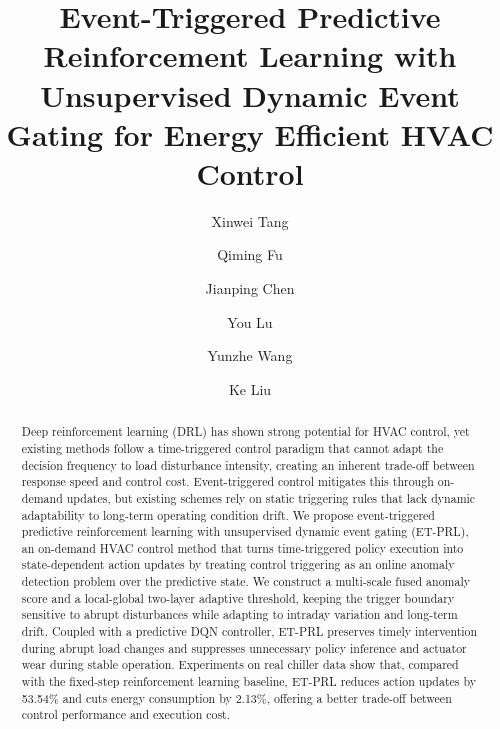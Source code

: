 \documentclass[preprint,12pt,number]{elsarticle}
\begin{document}
\begin{frontmatter}

\title{Event-Triggered Predictive Reinforcement Learning with Unsupervised Dynamic Event Gating for Energy Efficient HVAC Control}

\author[inst1,inst2]{Xinwei Tang}
\author[inst1,inst2]{Qiming Fu}
\author[inst1,inst2,inst3]{Jianping Chen}
\author[inst1,inst2]{You Lu}
\author[inst1,inst2]{Yunzhe Wang}
\author[inst4]{Ke Liu}

\begin{abstract}
Deep reinforcement learning (DRL) has shown strong potential for HVAC control, yet existing methods follow a time-triggered control paradigm that cannot adapt the decision frequency to load disturbance intensity, creating an inherent trade-off between response speed and control cost. Event-triggered control mitigates this through on-demand updates, but existing schemes rely on static triggering rules that lack dynamic adaptability to long-term operating condition drift. We propose event-triggered predictive reinforcement learning with unsupervised dynamic event gating (ET-PRL), an on-demand HVAC control method that turns time-triggered policy execution into state-dependent action updates by treating control triggering as an online anomaly detection problem over the predictive state. We construct a multi-scale fused anomaly score and a local-global two-layer adaptive threshold, keeping the trigger boundary sensitive to abrupt disturbances while adapting to intraday variation and long-term drift. Coupled with a predictive DQN controller, ET-PRL preserves timely intervention during abrupt load changes and suppresses unnecessary policy inference and actuator wear during stable operation. Experiments on real chiller data show that, compared with the fixed-step reinforcement learning baseline, ET-PRL reduces action updates by 53.54\% and cuts energy consumption by 2.13\%, offering a better trade-off between control performance and execution cost.
\end{abstract}


\end{frontmatter}
\end{document}
